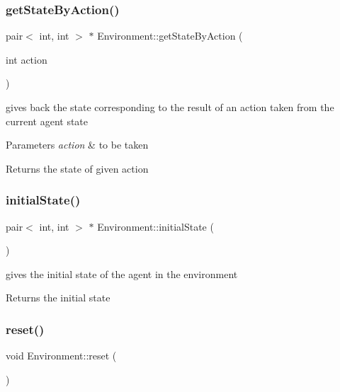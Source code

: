 \subsubsection{\texorpdfstring{get\+State\+By\+Action()}{getStateByAction()}}
{\footnotesize\ttfamily pair$<$ int, int $>$ $\ast$ Environment\+::get\+State\+By\+Action (\begin{DoxyParamCaption}\item[{int}]{action }\end{DoxyParamCaption})}

gives back the state corresponding to the result of an action taken from the current agent state 
\begin{DoxyParams}{Parameters}
{\em action} & to be taken \\
\hline
\end{DoxyParams}
\begin{DoxyReturn}{Returns}
the state of given action 
\end{DoxyReturn}
\mbox{\label{class_environment_a7a7745adf6e9a0aec3b750e26e629f8b}} 
\subsubsection{\texorpdfstring{initial\+State()}{initialState()}}
{\footnotesize\ttfamily pair$<$ int, int $>$ $\ast$ Environment\+::initial\+State (\begin{DoxyParamCaption}{ }\end{DoxyParamCaption})}

gives the initial state of the agent in the environment \begin{DoxyReturn}{Returns}
the initial state 
\end{DoxyReturn}
\mbox{\label{class_environment_a9bf96c5e6b817be1595b24992cde8e82}} 
\subsubsection{\texorpdfstring{reset()}{reset()}}
{\footnotesize\ttfamily void Environment\+::reset (\begin{DoxyParamCaption}{ }\end{DoxyParamCaption})}

